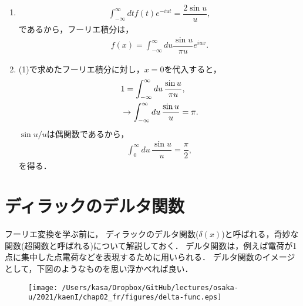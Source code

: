 \begin{enumerate}[(1)]
  \item
	\begin{align}
	  \int_{-\infty}^{\infty}dt f(t)e^{-iut} = \dfrac{2\sin u}{u},
	\end{align}
      であるから，フーリエ積分は，
       \begin{align}
	 f(x) = \int_{-\infty}^{\infty}du\dfrac{\sin u}{\pi u}e^{iux}. 
       \end{align}
  \item (1)で求めたフーリエ積分に対し，$x=0$を代入すると，
	\begin{align}
	  & 1 = \int_{-\infty}^{\infty}du\, \dfrac{\sin u}{\pi u}, \notag \\
          &\rightarrow \int_{-\infty}^{\infty}du\, \dfrac{\sin u}{ u} = \pi.
	\end{align}
	$\sin u/u$は偶関数であるから，
	\begin{align}
	 \int_{0}^{\infty}du\, \dfrac{\sin u}{ u} = \dfrac{\pi}{2}, 
	\end{align}
	を得る．
\end{enumerate}
%
\newpage
%
\section{ディラックのデルタ関数}
%
フーリエ変換を学ぶ前に，
ディラックのデルタ関数($\delta (x)$)と呼ばれる，奇妙な関数(超関数と呼ばれる)について解説しておく．
デルタ関数は，例えば電荷が1点に集中した点電荷などを表現するために用いられる．
デルタ関数のイメージとして，下図のようなものを思い浮かべれば良い．
\begin{figure}[htbp]
 \vspace*{-\intextsep}
 \centering
 \texttt{[image: /Users/kasa/Dropbox/GitHub/lectures/osaka-u/2021/kaenI/chap02\_fr/figures/delta-func.eps]} 
\end{figure}

